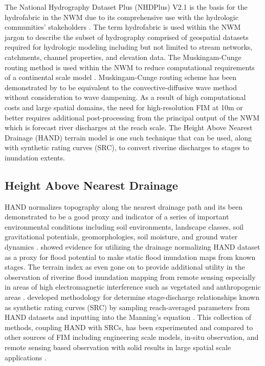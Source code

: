 The National Hydrography Dataset Plus (NHDPlus) V2.1 is the basis for the hydrofabric in the NWM due to its comprehensive use with the hydrologic communities' stakeholders \cite{mckay2012nhdplus}. 
The term hydrofabric is used within the NWM jargon to describe the subset of hydrography comprised of geospatial datasets required for hydrologic modeling including but not limited to stream networks, catchments, channel properties, and elevation data. 
The Muskingam-Cunge routing method is used within the NWM to reduce computational requirements of a continental scale model \cite{bedient2008hydrology,ponce1994variable,gochis2018wrf}.
Muskingam-Cunge routing scheme has been demonstrated by  to be equivalent to the convective-diffusive wave method without consideration to wave dampening.
As a result of high computational costs and large spatial domains, the need for high-resolution FIM at 10m or better requires additional post-processing from the principal output of the NWM which is forecast river discharges at the reach scale. The Height Above Nearest Drainage (HAND) terrain model is one such technique that can be used, along with synthetic rating curves (SRC), to convert riverine discharges to stages to inundation extents.
%
\subsection{Height Above Nearest Drainage}
%
HAND normalizes topography along the nearest drainage path and its been demonstrated to be a good proxy and indicator of a series of important environmental conditions including soil environments, landscape classes, soil gravitational potentials, geomorphologies, soil moisture, and ground water dynamics \cite{renno2008hand,nobre2011height}. 
 showed evidence for utilizing the drainage normalizing HAND dataset as a proxy for flood potential to make static flood inundation maps from known stages.
The terrain index as even gone on to provide additional utility in the observation of riverine flood inundation mapping from remote sensing especially in areas of high electromagnetic interference such as vegetated and anthropogenic areas \cite{aristizabal2020high,shastry2019using,huang2017comparison,twele2016sentinel}.
 developed methodology for determine stage-discharge relationships known as synthetic rating curves (SRC) by sampling reach-averaged parameters from HAND datasets and inputting into the Manning's equation \cite{gauckler1867etudes,manning1890flow}.
This collection of methods, coupling HAND with SRCs, has been experimented and compared to other sources of FIM including engineering scale models, in-situ observation, and remote sensing based observation with solid results in large spatial scale applications \cite{godbout2019error,johnson2019integrated,garousi2019terrain,nobre2016hand,afshari2018comparison,zheng2018geoflood,teng2015rapid,teng2017flood,zhang2018comparative}.

